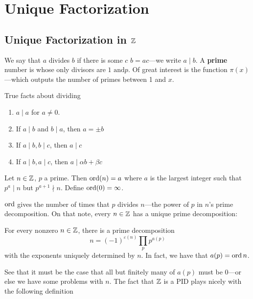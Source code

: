 \chapter{Unique Factorization}\label{ch:One}

\section{Unique Factorization in \(\mathbb{Z} \)}\label{sec:introduction}

We say that \(a\) divides \(b\) if there is some \(c\) \st \(b=ac\)---we write
\(a\mid b\). A \textbf{prime} number is whose only divisors are \(1 \text{ and
} p\). Of great
interest is the function \(\pi(x)\)---which outputs the number of primes between
1 and \(x\).

\begin{theorem}
  True facts about dividing
  \begin{enumerate}
    \item \(a \mid  a\) for \(a\neq 0\).
    \item If \(a \mid b\) and \(b\mid a\), then \(a=\pm b\)
    \item If \(a\mid b, b\mid c\), then \(a\mid c\)
    \item If \(a \mid b, a\mid c\), then \(a \mid \alpha b+ \beta c\)
  \end{enumerate}
\end{theorem}

\begin{definition}[ord\(_p\)]
  \label{def:ord}
  Let \(n \in \mathbb{Z} \), \(p\) a prime. Then \(\operatorname{ord}(n)=a\) where \(a\) is the
  largest integer such that \(p^a\mid n\) but \(p^{a+1}\nmid n\). Define \(\operatorname{ord} (0)=\infty\).
\end{definition}
%
\(\operatorname{ord}\) gives the number of times that \(p\) divides \(n\)---the power of \(p\)
in \(n\)'s prime decomposition. On that note, every \(n \in \mathbb{Z} \) has a unique
prime decomposition:
\begin{theorem}
  For every nonzero \(n \in \mathbb{Z} \), there is a prime decomposition
  \[
    n = (-1)^{\varepsilon(n)} \prod_p p^{a(p)}
  \]
  with the exponents uniquely determined by \(n\). In fact, we have that
  \(a(p)=\operatorname{ord} n\).
\end{theorem}

See that it must be the case that all but finitely many of \(a(p)\) must be
0---or else we have some problems with \(n\). The fact that \(\mathbb{Z} \) is a PID
plays nicely with the following definition

